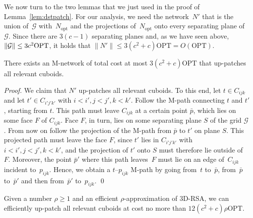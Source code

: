 \documentclass[11pt]{llncs}
\newcommand{\Nopt}{\ensuremath{N_\mathrm{opt}}\xspace}
\newcommand{\opt}{\ensuremath{\mathrm{OPT}}\xspace}
\newenvironment{pf}{\begin{proof}}{\qed\end{proof}}
\begin{document}
We now turn to the two lemmas that we just used in the proof of
Lemma~\ref{lem:dstpatch}.  For our analysis, we need the network~$N'$
that is the union of~$\mathcal G$ with~\Nopt and the projections
of~\Nopt onto every separating plane of~$\mathcal G$.  Since there are
$3(c-1)$ separating planes and, as we have seen above, $\|{\cal G}\|
\le 3c^2\opt$, it holds that $\|N'\| \le 3(c^2+c)\opt = O(\opt)$.

\begin{lemma}
  \label{lem:patching-cost}
  There exists an M-network of total cost at most $3(c^2+c)\opt$
  that up-patches all relevant cuboids.
\end{lemma}

\begin{pf}
  We claim that $N'$ up-patches all relevant cuboids.  To this end,
  let $t\in C_{ijk}$ and let $t'\in C_{i'j'k'}$ with $i<i',j<j',k<k'$.
  Follow the M-path connecting $t$ and $t'$, starting from $t$.  This
  path must leave $C_{ijk}$ at a certain point $\bar p$, which lies on
  some face $F$ of $C_{ijk}$.  Face $F$, in turn, lies on some
  separating plane $S$ of the grid $\mathcal G$.  From now on follow the
  projection of the M-path from $\bar p$ to $t'$ on plane $S$.  This
  projected path must leave the face $F$, since $t'$ lies in
  $C_{i'j'k'}$ with $i<i',j<j',k<k'$, and the projection of $t'$ onto
  $S$ must therefore lie outside of~$F$.  Moreover, the point $\bar p'$
  where this path leaves~$F$ must lie on an edge of~$C_{ijk}$ incident
  to~$p_{ijk}$.  Hence, we obtain a $t$--$p_{ijk}$ M-path by going
  from~$t$ to~$\bar p$, from~$\bar p$ to~$\bar p'$ and then from~$\bar
  p'$ to~$p_{ijk}$.
\end{pf}

\begin{lemma}
  \label{lem:patching-algorithm}
  Given a number $\rho \ge 1$ and an efficient $\rho$-approximation of
  3D-RSA, we can efficiently up-patch all relevant cuboids at cost no
  more than $12(c^2+c) \rho\opt$.
\end{lemma}
\end{document}

